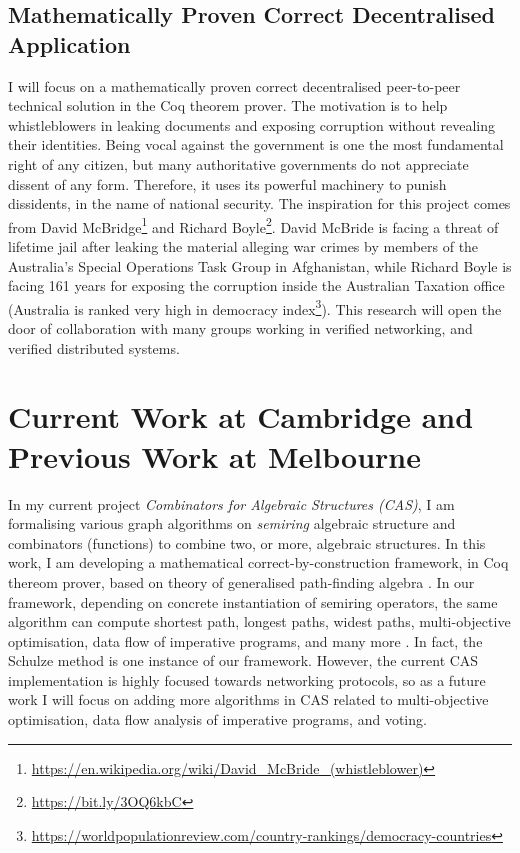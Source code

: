 \documentclass[a4paper]{article}
\begin{document}
\subsection{Mathematically Proven Correct Decentralised Application}
I will focus on a mathematically proven correct decentralised peer-to-peer technical solution 
\cite{liu2004linkable, Clarke2001, 7114482, schimmer2009peer, 10.1145/1866307.1866346} in the Coq theorem prover. 
The motivation 
is to help 
whistleblowers in leaking documents and exposing corruption without revealing their identities.
Being vocal against the government is one the most fundamental right of any citizen, but many 
authoritative governments do not appreciate dissent of any form. Therefore, it uses 
its powerful machinery to punish dissidents, in the name of national security. 
The inspiration for this project comes from David McBridge\footnote{\url{https://en.wikipedia.org/wiki/David_McBride_(whistleblower)}} and 
Richard Boyle\footnote{\url{https://bit.ly/3OQ6kbC}}.
David McBride 
is facing a threat of lifetime jail after
leaking the material alleging war crimes by members of the Australia's Special Operations
Task Group in Afghanistan, while Richard Boyle is facing 161 years for exposing the corruption 
inside the Australian Taxation office
(Australia is ranked very high in 
democracy index\footnote{\url{https://worldpopulationreview.com/country-rankings/democracy-countries}}). 
This research will open the door of collaboration with many groups working in verified 
networking, and verified distributed systems. 




\section{Current Work at Cambridge and Previous Work at Melbourne} 
In my current project \emph{Combinators for Algebraic Structures (CAS)},
I am formalising various graph algorithms on \emph{semiring} algebraic 
structure and combinators (functions) to 
combine two, or more, algebraic structures. In this work, I am developing 
a mathematical correct-by-construction \cite{10.1007/978-3-319-66107-0_26} 
framework, in Coq thereom prover, based on theory of generalised 
path-finding algebra \cite{10.1093/imamat/15.2.161, 10.1145/1080091.1080094}. 
In our framework, depending on concrete instantiation 
of semiring operators, the same algorithm can compute shortest path, longest paths, 
widest paths, multi-objective optimisation, data flow of imperative programs, and many more \cite{gondran2008graphs}. 
In fact, the Schulze method is one instance of our framework. However, 
the current CAS implementation is highly focused towards networking protocols,
so as a future work I will focus on adding more algorithms in CAS related 
to multi-objective optimisation, data flow analysis of imperative programs, and voting. 
\end{document}
